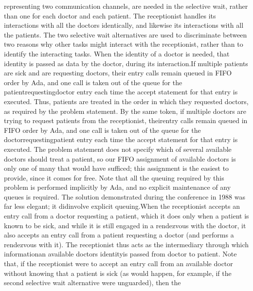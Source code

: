 representing two communication channels, are needed in the selective
wait, rather than one for each doctor and each patient. The receptionist
handles its interactions with all the doctors identically, and likewise
its interactions with all the patients. The two selective wait alternatives
are used to discriminate between two reasons why other tasks might
interact with the receptionist, rather than to identify the interacting
tasks. When the identity of a doctor is needed, that identity is passed
as data by the doctor, during its interaction.\Endpara[]
\Para[]If multiple patients are sick and are requesting doctors, their
entry calls remain queued in FIFO order by Ada, and one call is taken
out of the queue for the \tyxffmxmono[]patient\Symuns[]requesting\Symuns[]doctor%
\tyxffmxendmono[] entry each time the accept statement for that entry
is executed. Thus, patients are treated in the order in which they
requested doctors, as required by the problem statement. By the same
token, if multiple doctors are trying to request patients from the
receptionist, \txtxemph[]their\txtxendemph[] entry calls remain queued
in FIFO order by Ada, and one call is taken out of the queue for the
\tyxffmxmono[]doctor\Symuns[]requesting\Symuns[]patient%
\tyxffmxendmono[] entry each time the accept statement for that entry
is executed. The problem statement does not specify which of several
available doctors should treat a patient, so our FIFO assignment of
available doctors is only one of many that would have sufficed; this
assignment is the easiest to provide, since it comes for free. Note
that all the queuing required by this problem is performed implicitly
by Ada, and no explicit maintenance of any queues is required.%
\NtFoot[]\NtNtpar[]The solution demonstrated during the conference
in 1988 was far less elegant; it \txtxemph[]did\txtxendemph[] involve
explicit queuing.\NtEndntpar[]\NtEndfoot[]\Endpara[]
\Para[]When the receptionist accepts an entry call from a doctor requesting
a patient, which it does only when a patient is known to be sick,
and while it is still engaged in a rendezvous with the doctor, it
also accepts an entry call from a patient requesting a doctor (and
performs a rendezvous with it). The receptionist thus acts as the
intermediary through which information\EmDash[]an available doctor\rsquo[]s
identity\EmDash[]is passed from doctor to patient. Note that, if the
receptionist were to accept an entry call from an available doctor
without knowing that a patient is sick (as would happen, for example,
if the second selective wait alternative were unguarded), then the
